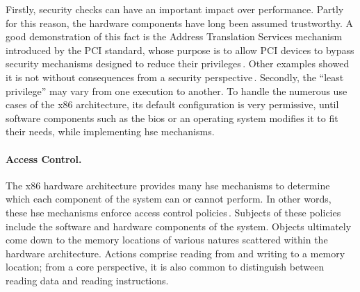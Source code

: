 Firstly, security checks can have an important impact over performance.
%
Partly for this reason, the hardware components have long been assumed
trustworthy.
%
A good demonstration of this fact is the Address Translation Services mechanism
introduced by the PCI standard, whose purpose is to allow PCI devices to bypass
security mechanisms designed to reduce their
privileges\,\cite{daubignard2017protip}.
%
Other examples showed it is not without consequences from a security
perspective\,\cite{nohl2014badusb,hudson2015thunderstrike,chifflier2013uefi}.
%
Secondly, the ``least privilege'' may vary from one execution to another.
%
To handle the numerous use cases of the x86 architecture, its default
configuration is very permissive, until software components such as the
\ac{bios} or an operating system modifies it to fit their needs, while
implementing \ac{hse} mechanisms.


\paragraph{Access Control.}
%
The x86 hardware architecture provides many \ac{hse} mechanisms to determine
which \IO each component of the system can or cannot perform.
%
In other words, these \ac{hse} mechanisms enforce access control
policies\,\cite{sandhu1994access}.
%
Subjects of these policies include the software and hardware components of the
system.
%
Objects ultimately come down to the memory locations of various natures
scattered within the hardware architecture.
%
Actions comprise reading from and writing to a memory location; from a core
perspective, it is also common to distinguish between reading data and reading
instructions.

